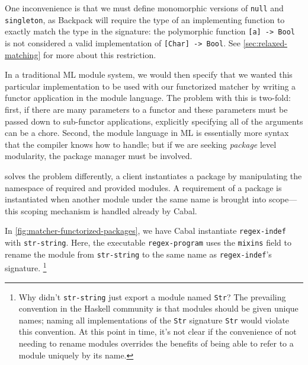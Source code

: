 One inconvenience is that we must define monomorphic
versions of \verb|null| and \verb|singleton|, as Backpack will require
the type of an implementing function to exactly match the type
in the signature: the polymorphic function \verb|[a] -> Bool| is not
considered a valid implementation of \verb|[Char] -> Bool|.  See
\cref{sec:relaxed-matching} for more about this restriction.




In a traditional ML module system, we would then specify that we wanted this
particular implementation to be used with our functorized matcher by writing
a functor application in the module language.
The problem with this is two-fold: first, if there are many parameters to a functor
and these parameters must be passed down to sub-functor applications, explicitly specifying
all of the arguments can be a chore.  Second, the module language in ML is essentially
more syntax that the compiler knows how to handle; but if we are seeking
\emph{package} level modularity, the package manager must be involved.

\Backpack{} solves the problem differently, a client instantiates a package
by manipulating the namespace of required and provided modules.
A requirement of a package is instantiated when
another module under the same name is brought into scope---this scoping
mechanism is handled already by Cabal.

In \cref{fig:matcher-functorized-packages}, we have Cabal instantiate
\verb|regex-indef| with \verb|str-string|.
Here, the executable \verb|regex-program| uses the
\verb|mixins| field to rename the module from \verb|str-string| to the
same name as \verb|regex-indef|'s signature.%
%
\footnote{Why didn't \texttt{str-string} just export
a module named \texttt{Str}?  The prevailing convention in the Haskell
community is that modules should be given unique names; naming all
implementations of the \texttt{Str} signature \texttt{Str} would violate
this convention.  At this point in time, it's not clear if the
convenience of not needing to rename modules overrides the benefits of
being able to refer to a module uniquely by its name.}

